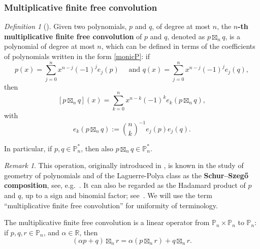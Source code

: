 \documentclass[reqno,11pt]{amsart}
\theoremstyle{remark}
\newtheorem{remark}[theorem]{Remark}
\newtheorem{definition}[theorem]{Definition}
\renewcommand{\P}{\mathbb{P}}
\newcommand{\monicpols}{\mathbb P_n^*}
\newcommand{\rr}{\mathbb{R}}
\begin{document}
\subsubsection{Multiplicative finite free convolution}
\begin{definition}[\cite{MR4408504}] \label{def:MultiplicativeConv}
Given two polynomials, $p$ and $q$, of degree at most $n$, the 
\textbf{$n$-th multiplicative finite free convolution} of $p$ and $q$, denoted as $p\boxtimes_n q$, is a polynomial of degree at most $n$, which can be defined in terms of the coefficients of polynomials written in the form \eqref{monicP}: if
\begin{equation}
    \label{defFMULTCONV}
    p(x)=\sum_{j=0}^n x^{n-j}(-1)^j e_j(p) \quad \text { and } q(x)=\sum_{j=0}^n x^{n-j}(-1)^j e_j(q),
\end{equation}
then
$$
[p\boxtimes_n q](x) = \sum_{k=0}^n x^{n-k}(-1)^k e_k(p\boxtimes_n q),
$$
with
\begin{equation}
    \label{coeffMultConv}
  e_k(p\boxtimes_n q) :=  \binom{n}{k}^{-1} e_j(p) e_j(q).
\end{equation}
\end{definition}
In particular, if $p, q \in \monicpols$, then also $p\boxtimes_n q \in \monicpols$. 
\begin{remark}
This operation, originally introduced in \cite{szego1922}, is known in the study of geometry of polynomials and of the Laguerre-Polya class as the \textbf{Schur--Szeg\H{o} composition}, see, e.g.~\cite{MR2242036, MR2375107}. It can also be regarded as the Hadamard product of $p$ and $q$, up to a sign and binomial factor; see~\cite{MR2825108}. We will use the term ``multiplicative finite free convolution'' for uniformity of terminology.
\end{remark}

The multiplicative finite free convolution is a linear operator  from $\P_n \times \P_n$ to $\P_n$: if $p,q,r\in \P_n$,  and $\alpha\in\rr$, then 
\begin{equation*}
    (\alpha p+q)\boxtimes_n r= \alpha (p\boxtimes_n r)+q\boxtimes_n r.
\end{equation*}
\end{document}
